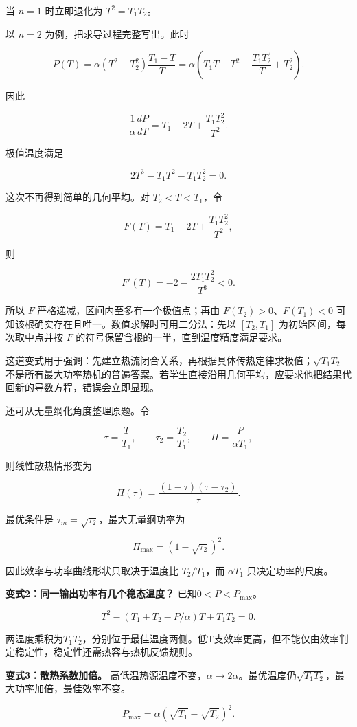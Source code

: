 \documentclass[12pt,a4paper,UTF8]{ctexart}
\begin{document}
当 \(n=1\) 时立即退化为 \(T^2=T_1T_2\)。

以 \(n=2\) 为例，把求导过程完整写出。此时

\[
P(T)=\alpha(T^2-T_2^2)\frac{T_1-T}{T}
=\alpha\left(T_1T-T^2-\frac{T_1T_2^2}{T}+T_2^2\right).
\]

因此

\[
\frac1\alpha\frac{dP}{dT}
=T_1-2T+\frac{T_1T_2^2}{T^2}.
\]

极值温度满足

\[
\boxed{2T^3-T_1T^2-T_1T_2^2=0}.
\]

这次不再得到简单的几何平均。对 \(T_2<T<T_1\)，令

\[
F(T)=T_1-2T+\frac{T_1T_2^2}{T^2},
\]

则

\[
F'(T)=-2-\frac{2T_1T_2^2}{T^3}<0.
\]

所以 \(F\) 严格递减，区间内至多有一个极值点；再由
\(F(T_2)>0\)、\(F(T_1)<0\)
可知该根确实存在且唯一。数值求解时可用二分法：先以 \([T_2,T_1]\)
为初始区间，每次取中点并按 \(F\)
的符号保留含根的一半，直到温度精度满足要求。

这道变式用于强调：先建立热流闭合关系，再根据具体传热定律求极值；\(\sqrt{T_1T_2}\)
不是所有最大功率热机的普遍答案。若学生直接沿用几何平均，应要求他把结果代回新的导数方程，错误会立即显现。

还可从无量纲化角度整理原题。令

\[
\tau=\frac{T}{T_1},
\qquad
\tau_2=\frac{T_2}{T_1},
\qquad
\Pi=\frac{P}{\alpha T_1},
\]

则线性散热情形变为

\[
\Pi(\tau)=\frac{(1-\tau)(\tau-\tau_2)}{\tau}.
\]

最优条件是 \(\tau_m=\sqrt{\tau_2}\)，最大无量纲功率为

\[
\Pi_{\max}=(1-\sqrt{\tau_2})^2.
\]

因此效率与功率曲线形状只取决于温度比 \(T_2/T_1\)，而 \(\alpha T_1\)
只决定功率的尺度。

\textbf{变式2：同一输出功率有几个稳态温度？} 已知\(0<P<P_{\max}\)。

\[T^2-(T_1+T_2-P/\alpha)T+T_1T_2=0.\]

两温度乘积为\(T_1T_2\)，分别位于最佳温度两侧。低T支效率更高，但不能仅由效率判定稳定性，稳定性还需热容与热机反馈规则。

\textbf{变式3：散热系数加倍。}
高低温热源温度不变，\(\alpha\to2\alpha\)。最优温度仍\(\sqrt{T_1T_2}\)，最大功率加倍，最佳效率不变。

\[P_{\max}=\alpha(\sqrt{T_1}-\sqrt{T_2})^2.\]
\end{document}
